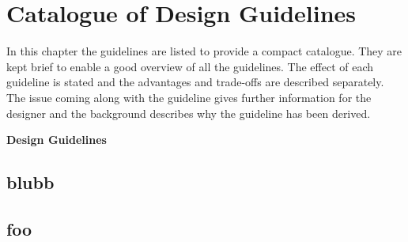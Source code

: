 \chapter{Catalogue of Design Guidelines}

In this chapter the guidelines are listed to provide a compact catalogue. They are kept brief to enable a good overview of all the guidelines. The effect of each guideline is stated and the advantages and trade-offs are described separately. The issue coming along with the guideline gives further information for the designer and the background describes why the guideline has been derived.

\textbf{Design Guidelines}



\minitoc%

\section*{blubb}

\section*{foo}

